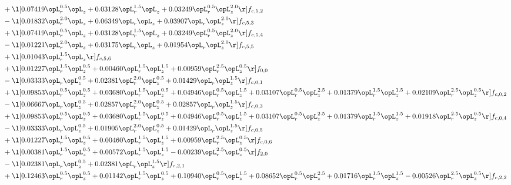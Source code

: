 \begin{alignat}{2}
& + \l[  0.07419 \opL_r^{0.5} \opL_z +  0.03128 \opL_r^{1.5} \opL_z +  0.03249 \opL_r^{0.5} \opL_z^{2.0}  \r] f_{c,5,2} \nonumber \\ 
& - \l[  0.01832 \opL_r^{2.0} \opL_z +  0.06349 \opL_r \opL_z +  0.03907 \opL_r \opL_z^{2.0}  \r] f_{c,5,3} \nonumber \\ 
& + \l[  0.07419 \opL_r^{0.5} \opL_z +  0.03128 \opL_r^{1.5} \opL_z +  0.03249 \opL_r^{0.5} \opL_z^{2.0}  \r] f_{c,5,4} \nonumber \\ 
& - \l[  0.01221 \opL_r^{2.0} \opL_z +  0.03175 \opL_r \opL_z +  0.01954 \opL_r \opL_z^{2.0}  \r] f_{c,5,5} \nonumber \\ 
& + \l[  0.01043 \opL_r^{1.5} \opL_z  \r] f_{c,5,6} \nonumber \\ 
& + \l[  0.01227 \opL_r^{1.5} \opL_z^{0.5} +  0.00460 \opL_r^{1.5} \opL_z^{1.5} +  0.00959 \opL_r^{2.5} \opL_z^{0.5}  \r] f_{0,0} \nonumber \\ 
& - \l[  0.03333 \opL_r \opL_z^{0.5} +  0.02381 \opL_r^{2.0} \opL_z^{0.5} +  0.01429 \opL_r \opL_z^{1.5}  \r] f_{c,0,1} \nonumber \\ 
& + \l[  0.09853 \opL_r^{0.5} \opL_z^{0.5} +  0.03680 \opL_r^{1.5} \opL_z^{0.5} +  0.04946 \opL_r^{0.5} \opL_z^{1.5} +  0.03107 \opL_r^{0.5} \opL_z^{2.5} +  0.01379 \opL_r^{1.5} \opL_z^{1.5} +  0.02109 \opL_r^{2.5} \opL_z^{0.5}  \r] f_{c,0,2} \nonumber \\ 
& - \l[  0.06667 \opL_r \opL_z^{0.5} +  0.02857 \opL_r^{2.0} \opL_z^{0.5} +  0.02857 \opL_r \opL_z^{1.5}  \r] f_{c,0,3} \nonumber \\ 
& + \l[  0.09853 \opL_r^{0.5} \opL_z^{0.5} +  0.03680 \opL_r^{1.5} \opL_z^{0.5} +  0.04946 \opL_r^{0.5} \opL_z^{1.5} +  0.03107 \opL_r^{0.5} \opL_z^{2.5} +  0.01379 \opL_r^{1.5} \opL_z^{1.5} +  0.01918 \opL_r^{2.5} \opL_z^{0.5}  \r] f_{c,0,4} \nonumber \\ 
& - \l[  0.03333 \opL_r \opL_z^{0.5} +  0.01905 \opL_r^{2.0} \opL_z^{0.5} +  0.01429 \opL_r \opL_z^{1.5}  \r] f_{c,0,5} \nonumber \\ 
& + \l[  0.01227 \opL_r^{1.5} \opL_z^{0.5} +  0.00460 \opL_r^{1.5} \opL_z^{1.5} +  0.00959 \opL_r^{2.5} \opL_z^{0.5}  \r] f_{c,0,6} \nonumber \\ 
& + \l[  0.00381 \opL_r^{1.5} \opL_z^{0.5} +  0.00572 \opL_r^{1.5} \opL_z^{1.5}   -0.00239 \opL_r^{2.5} \opL_z^{0.5}  \r] f_{2,0} \nonumber \\ 
& - \l[  0.02381 \opL_r \opL_z^{0.5} +  0.02381 \opL_r \opL_z^{1.5}  \r] f_{c,2,1} \nonumber \\ 
& + \l[  0.12463 \opL_r^{0.5} \opL_z^{0.5} +  0.01142 \opL_r^{1.5} \opL_z^{0.5} +  0.10940 \opL_r^{0.5} \opL_z^{1.5} +  0.08652 \opL_r^{0.5} \opL_z^{2.5} +  0.01716 \opL_r^{1.5} \opL_z^{1.5}   -0.00526 \opL_r^{2.5} \opL_z^{0.5}  \r] f_{c,2,2} \nonumber \\ 

\end{alignat}
